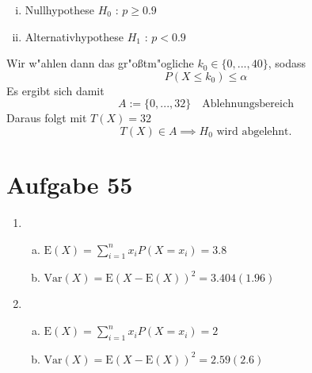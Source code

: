 \documentclass[10pt, oneside]{article}
\begin{document}
\begin{enumerate}[(a)]
\begin{enumerate}[i)]
            \item Nullhypothese $H_0$ : $p \geq 0.9$
            \item Alternativhypothese $H_1$ : $p < 0.9$
        \end{enumerate}
        Wir w"ahlen dann das gr"o{\ss}tm"ogliche $k_0 \in \{0,...,40\}$,
        sodass
        \begin{equation*}
            P(X \leq k_0) \leq \alpha
        \end{equation*}
        Es ergibt sich damit
        \begin{equation*}
            A := \{0,...,32\} \quad \text{Ablehnungsbereich}
        \end{equation*}
        Daraus folgt mit $T(X) = 32$
        \begin{equation*}
            T(X) \in A \implies H_0 \text{ wird abgelehnt.}
        \end{equation*}
\end{enumerate}

% 
% 

\section{Aufgabe 55}

\begin{enumerate}
    \item
        \begin{enumerate}[(a)]
            \item $\text{E}(X) = \sum_{i = 1}^n x_iP(X = x_i) = 3.8$
            \item $\text{Var}(X) = \text{E}(X - \text{E}(X))^2 = 3.404 (1.96)$
        \end{enumerate}

    \item
        \begin{enumerate}[(a)]
            \item $\text{E}(X) = \sum_{i = 1}^n x_iP(X = x_i) = 2$
            \item $\text{Var}(X) = \text{E}(X - \text{E}(X))^2 = 2.59 (2.6)$
        \end{enumerate}
\end{enumerate}
\end{document}
